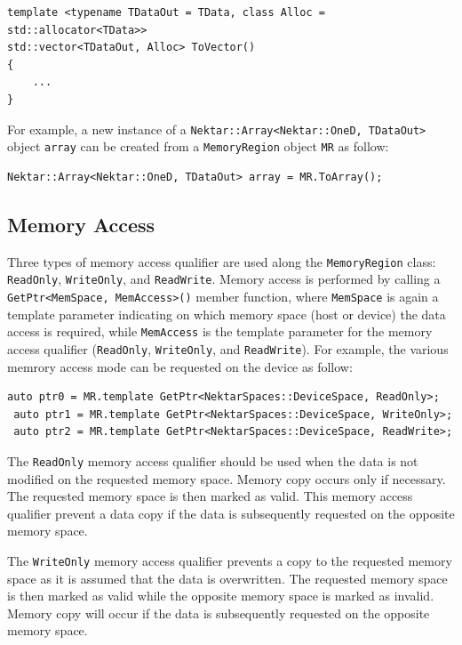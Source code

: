 \begin{lstlisting}[style=C++Style]
template <typename TDataOut = TData, class Alloc = std::allocator<TData>>
std::vector<TDataOut, Alloc> ToVector()
{
    ...
}
\end{lstlisting}

For example, a new instance of a \lstinline[style=C++Style]!Nektar::Array<Nektar::OneD, TDataOut>! object \lstinline[style=C++Style]!array! can be created from a \lstinline[style=C++Style]!MemoryRegion! object \lstinline[style=C++Style]!MR! as follow:
\begin{lstlisting}[style=C++Style]
 Nektar::Array<Nektar::OneD, TDataOut> array = MR.ToArray();
\end{lstlisting}

\subsection{Memory Access}
Three types of memory access qualifier are used along the \lstinline[style=C++Style]!MemoryRegion! class: \lstinline[style=C++Style]!ReadOnly!, \lstinline[style=C++Style]!WriteOnly!, and \lstinline[style=C++Style]!ReadWrite!. Memory access is performed by calling a \lstinline[style=C++Style]!GetPtr<MemSpace, MemAccess>()! member function, where \lstinline[style=C++Style]!MemSpace! is again a template parameter indicating on which memory space (host or device) the data access is required, while \lstinline[style=C++Style]!MemAccess! is the template parameter for the memory access qualifier (\lstinline[style=C++Style]!ReadOnly!, \lstinline[style=C++Style]!WriteOnly!, and \lstinline[style=C++Style]!ReadWrite!). For example, the various memrory access mode can be requested on the device as follow:
\begin{lstlisting}[style=C++Style]
 auto ptr0 = MR.template GetPtr<NektarSpaces::DeviceSpace, ReadOnly>;
 auto ptr1 = MR.template GetPtr<NektarSpaces::DeviceSpace, WriteOnly>;
 auto ptr2 = MR.template GetPtr<NektarSpaces::DeviceSpace, ReadWrite>;
\end{lstlisting}

The \lstinline[style=C++Style]!ReadOnly! memory access qualifier should be used when the data is not modified on the requested memory space. Memory copy occurs only if necessary. The requested memory space is then marked as valid. This memory access qualifier prevent a data copy if the data is subsequently requested on the opposite memory space.

The \lstinline[style=C++Style]!WriteOnly! memory access qualifier prevents a copy to the requested memory space as it is assumed that the data is overwritten. The requested memory space is then marked as valid while the opposite memory space is marked as invalid. Memory copy will occur if the data is subsequently requested on the opposite memory space.

